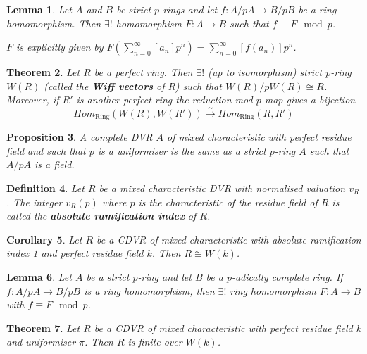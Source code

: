 \documentclass[a4paper]{article}
\newtheorem{definition}{Definition}
\newtheorem{lemma}[definition]{Lemma}
\newtheorem{theorem}[definition]{Theorem}
\newtheorem{prop}[definition]{Proposition}
\newtheorem{corollary}[definition]{Corollary}
\begin{document}
\begin{lemma}
	Let $A$ and $B$ be strict $p$-rings and let $f: A/pA \to B/pB$ be a ring homomorphism.
	Then $\exists!$ homomorphism $F:A \to B$ such that $f \equiv F \mod p$.
	
	$F$ is explicitly given by $F(\sum_{n=0}^\infty [a_n]p^n) = \sum_{n=0}^\infty [f(a_n)]p^n$.
\end{lemma}

\begin{theorem}
	Let $R$ be a perfect ring.
	Then $\exists!$ (up to isomorphism) strict $p$-ring $W(R)$ (called the \textbf{Wiff vectors} of R)
	such that $W(R)/pW(R) \cong R$.
	Moreover, if $R'$ is another perfect ring the reduction mod $p$ map gives a bijection
	$$Hom_{\text{Ring}}(W(R), W(R')) \overset{\sim}{\longrightarrow} Hom_{\text{Ring}}(R, R')$$
\end{theorem}

\begin{prop}
	A complete DVR $A$ of mixed characteristic with perfect residue field and such that $p$ is a uniformiser
	is the same as a strict $p$-ring $A$ such that $A/pA$ is a field.
\end{prop}

\begin{definition}
	Let $R$ be a mixed characteristic DVR with normalised valuation $v_R$.
	The integer $v_R(p)$ where $p$ is the characteristic of the residue field of $R$
	is called the \textbf{absolute ramification index} of $R$.
\end{definition}

\begin{corollary}
	Let $R$ be a CDVR of mixed characteristic with absolute ramification index 1 and perfect residue field $k$.
	Then $R \cong W(k)$.
\end{corollary}
\setcounter{definition}{52}
\renewcommand{\thedefinition}{\arabic{definition}'}
\begin{lemma}
	Let $A$ be a strict $p$-ring and let $B$ be a $p$-adically complete ring.
	If $f: A/pA \to B/pB$ is a ring homomorphism,
	then $\exists!$ ring homomorphism $F:A \to B$ with $f \equiv F \mod p$.
\end{lemma}
\setcounter{definition}{57}
\renewcommand{\thedefinition}{\arabic{definition}}

\begin{theorem}
	Let $R$ be a CDVR of mixed characteristic with perfect residue field $k$ and uniformiser $\pi$.
	Then $R$ is finite over $W(k)$.
\end{theorem}
\end{document}
